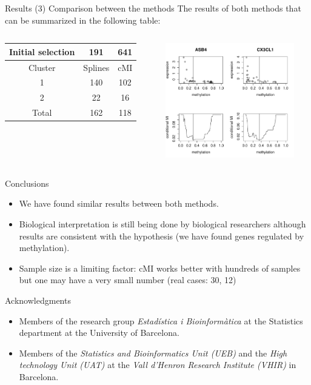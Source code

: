 \documentclass[handout]{beamer}
\begin{document}
\begin{frame}{Results (3) Comparison between the methods}
The results of both methods that can be summarized in the following table:
\begin{columns}
\begin{column}{.5\linewidth}
\begin{center}
\begin{tabular}{|c|c|c|}
\hline
Initial selection & 191 & 641 \\
\hline
\hline
Cluster & Splines & cMI \\
\hline
1 & 140 & 102 \\
2 & 22 & 16 \\
\hline
Total & 162 & 118 \\
\hline 
\end{tabular}
\end{center}
\end{column}
\begin{column}{.5\linewidth}
\begin{center}
\includegraphics[height=5cm]{./images/grafic_two_genes.pdf}
\end{center}
\end{column}
\end{columns}
\end{frame}

\begin{frame}{Conclusions}
  \begin{itemize}
  \item We have found similar results between both methods.
  \item Biological interpretation is still being done by biological
    researchers although results are consistent with the hypothesis
    (we have found genes regulated by methylation).
  \item Sample size is a limiting factor: cMI works better with hundreds of samples but one may have a very small number (real cases: 30, 12)
\end{itemize}
\end{frame}

\begin{frame}{Acknowledgments}
  \begin{itemize}
  \item Members of the research group \emph{Estadística i Bioinformàtica} at the Statistics department at the University of Barcelona.
 \item Members of the \emph{Statistics and Bioinformatics Unit (UEB)} and the \emph{High technology Unit (UAT)} at the \emph{Vall d'Henron Research Institute (VHIR)} in Barcelona.
  \end{itemize}
\end{frame}
\end{document}
